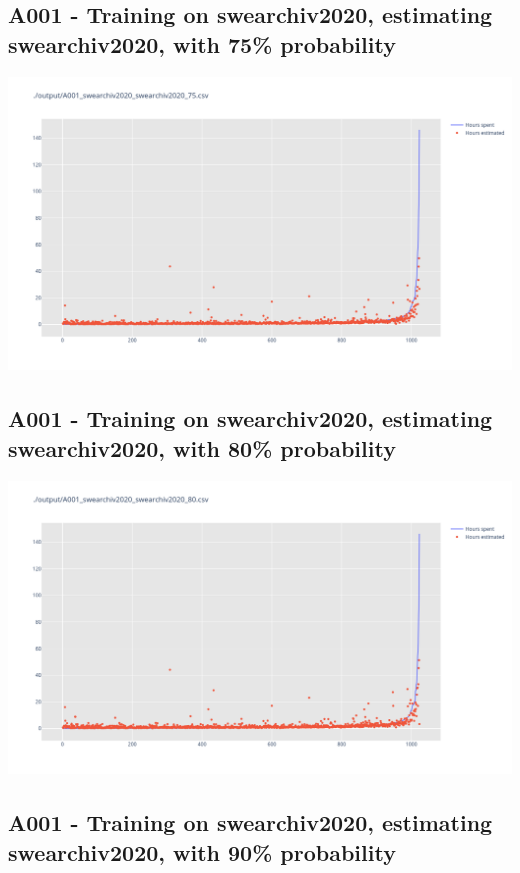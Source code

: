 \newpage

\subsection{A001 - Training on swearchiv2020, estimating swearchiv2020, with 75\% probability}

\includegraphics[width=\textwidth]{Scripts/output/A001_swearchiv2020_swearchiv2020_75.csv.png}

\newpage

\subsection{A001 - Training on swearchiv2020, estimating swearchiv2020, with 80\% probability}

\includegraphics[width=\textwidth]{Scripts/output/A001_swearchiv2020_swearchiv2020_80.csv.png}

\newpage

\subsection{A001 - Training on swearchiv2020, estimating swearchiv2020, with 90\% probability}

